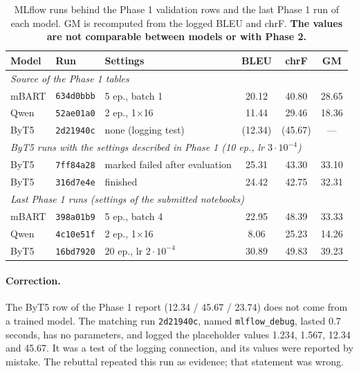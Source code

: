\documentclass[a4paper,12pt]{article}
\begin{document}
\begin{table}[H]
    \centering\footnotesize
    \caption{MLflow runs behind the Phase 1 validation rows and the last Phase 1 run of each model. GM is recomputed from the logged BLEU and chrF. \textbf{The values are not comparable between models or with Phase 2.}}
    \label{tab:phaseone}
    \begin{tabular}{lllccc}
        \toprule
        \textbf{Model} & \textbf{Run} & \textbf{Settings} & \textbf{BLEU} & \textbf{chrF} & \textbf{GM} \\
        \midrule
        \multicolumn{6}{l}{\emph{Source of the Phase 1 tables}} \\
        mBART & \texttt{634d0bbb} & 5 ep., batch 1 & 20.12 & 40.80 & 28.65 \\
        Qwen & \texttt{52ae01a0} & 2 ep., 1$\times$16 & 11.44 & 29.46 & 18.36 \\
        ByT5 & \texttt{2d21940c} & none (logging test) & (12.34) & (45.67) & --- \\
        \multicolumn{6}{l}{\emph{ByT5 runs with the settings described in Phase 1 (10 ep., lr $3\cdot10^{-4}$)}} \\
        ByT5 & \texttt{7ff84a28} & marked failed after evaluation & 25.31 & 43.30 & 33.10 \\
        ByT5 & \texttt{316d7e4e} & finished & 24.42 & 42.75 & 32.31 \\
        \multicolumn{6}{l}{\emph{Last Phase 1 runs (settings of the submitted notebooks)}} \\
        mBART & \texttt{398a01b9} & 5 ep., batch 4 & 22.95 & 48.39 & 33.33 \\
        Qwen & \texttt{4c10e51f} & 2 ep., 1$\times$16 & 8.06 & 25.23 & 14.26 \\
        ByT5 & \texttt{16bd7920} & 20 ep., lr $2\cdot10^{-4}$ & 30.89 & 49.83 & 39.23 \\
        \bottomrule
    \end{tabular}
\end{table}

\paragraph{Correction.}
The ByT5 row of the Phase 1 report (12.34 / 45.67 / 23.74) does not come from a trained model. The matching run \texttt{2d21940c}, named \texttt{mlflow\_debug}, lasted 0.7 seconds, has no parameters, and logged the placeholder values 1.234, 1.567, 12.34 and 45.67. It was a test of the logging connection, and its values were reported by mistake. The rebuttal repeated this run as evidence; that statement was wrong.
\end{document}
